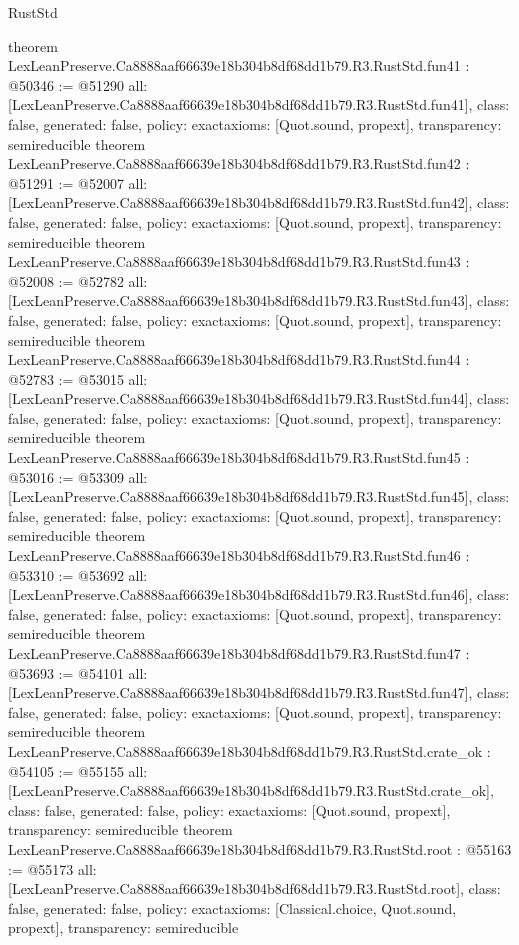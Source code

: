\begin{lexlean}{RustStd}
\begin{coremodule}
{}
theorem LexLeanPreserve.Ca8888aaf66639e18b304b8df68dd1b79.R3.RustStd.fun41 : @50346 := @51290 {
  all: [LexLeanPreserve.Ca8888aaf66639e18b304b8df68dd1b79.R3.RustStd.fun41],
  class: false,
  generated: false,
  policy: exact{axioms: [Quot.sound, propext]},
  transparency: semireducible
}
theorem LexLeanPreserve.Ca8888aaf66639e18b304b8df68dd1b79.R3.RustStd.fun42 : @51291 := @52007 {
  all: [LexLeanPreserve.Ca8888aaf66639e18b304b8df68dd1b79.R3.RustStd.fun42],
  class: false,
  generated: false,
  policy: exact{axioms: [Quot.sound, propext]},
  transparency: semireducible
}
theorem LexLeanPreserve.Ca8888aaf66639e18b304b8df68dd1b79.R3.RustStd.fun43 : @52008 := @52782 {
  all: [LexLeanPreserve.Ca8888aaf66639e18b304b8df68dd1b79.R3.RustStd.fun43],
  class: false,
  generated: false,
  policy: exact{axioms: [Quot.sound, propext]},
  transparency: semireducible
}
theorem LexLeanPreserve.Ca8888aaf66639e18b304b8df68dd1b79.R3.RustStd.fun44 : @52783 := @53015 {
  all: [LexLeanPreserve.Ca8888aaf66639e18b304b8df68dd1b79.R3.RustStd.fun44],
  class: false,
  generated: false,
  policy: exact{axioms: [Quot.sound, propext]},
  transparency: semireducible
}
theorem LexLeanPreserve.Ca8888aaf66639e18b304b8df68dd1b79.R3.RustStd.fun45 : @53016 := @53309 {
  all: [LexLeanPreserve.Ca8888aaf66639e18b304b8df68dd1b79.R3.RustStd.fun45],
  class: false,
  generated: false,
  policy: exact{axioms: [Quot.sound, propext]},
  transparency: semireducible
}
theorem LexLeanPreserve.Ca8888aaf66639e18b304b8df68dd1b79.R3.RustStd.fun46 : @53310 := @53692 {
  all: [LexLeanPreserve.Ca8888aaf66639e18b304b8df68dd1b79.R3.RustStd.fun46],
  class: false,
  generated: false,
  policy: exact{axioms: [Quot.sound, propext]},
  transparency: semireducible
}
theorem LexLeanPreserve.Ca8888aaf66639e18b304b8df68dd1b79.R3.RustStd.fun47 : @53693 := @54101 {
  all: [LexLeanPreserve.Ca8888aaf66639e18b304b8df68dd1b79.R3.RustStd.fun47],
  class: false,
  generated: false,
  policy: exact{axioms: [Quot.sound, propext]},
  transparency: semireducible
}
theorem LexLeanPreserve.Ca8888aaf66639e18b304b8df68dd1b79.R3.RustStd.crate_ok : @54105 := @55155 {
  all: [LexLeanPreserve.Ca8888aaf66639e18b304b8df68dd1b79.R3.RustStd.crate_ok],
  class: false,
  generated: false,
  policy: exact{axioms: [Quot.sound, propext]},
  transparency: semireducible
}
theorem LexLeanPreserve.Ca8888aaf66639e18b304b8df68dd1b79.R3.RustStd.root : @55163 := @55173 {
  all: [LexLeanPreserve.Ca8888aaf66639e18b304b8df68dd1b79.R3.RustStd.root],
  class: false,
  generated: false,
  policy: exact{axioms: [Classical.choice, Quot.sound, propext]},
  transparency: semireducible
}


\end{coremodule}
\end{lexlean}
